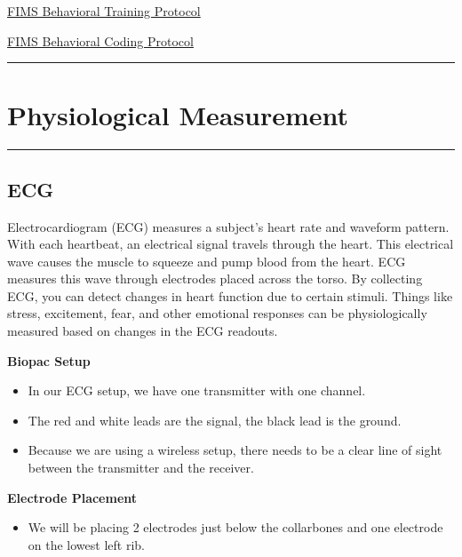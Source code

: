 \documentclass[
]{book}
\providecommand{\tightlist}{%
  \setlength{\itemsep}{0pt}\setlength{\parskip}{0pt}}
\begin{document}
\href{https://docs.google.com/document/d/1oLEg1gAdpcrDWg1Vlh0z_esq9fBy9CKBrNuU-ZokaKg/edit?usp=sharing}{FIMS Behavioral Training Protocol}

\href{https://docs.google.com/document/d/1zd4BD7-yQZxle4bH_cXrEaqFAd3MCVKATnVE1PnWn_4/edit?usp=sharing}{FIMS Behavioral Coding Protocol}

\begin{center}\rule{0.5\linewidth}{0.5pt}\end{center}

\hypertarget{physiological-measurement}{%
\section{Physiological Measurement}\label{physiological-measurement}}

\begin{center}\rule{0.5\linewidth}{0.5pt}\end{center}

\hypertarget{ecg}{%
\subsection{ECG}\label{ecg}}

Electrocardiogram (ECG) measures a subject's heart rate and waveform pattern. With each heartbeat, an electrical signal travels through the heart. This electrical wave causes the muscle to squeeze and pump blood from the heart. ECG measures this wave through electrodes placed across the torso. By collecting ECG, you can detect changes in heart function due to certain stimuli. Things like stress, excitement, fear, and other emotional responses can be physiologically measured based on changes in the ECG readouts.

\textbf{Biopac Setup}

\begin{itemize}
\tightlist
\item
  In our ECG setup, we have one transmitter with one channel.
\item
  The red and white leads are the signal, the black lead is the ground.
\item
  Because we are using a wireless setup, there needs to be a clear line of sight between the transmitter and the receiver.
\end{itemize}

\textbf{Electrode Placement}

\begin{itemize}
\tightlist
\item
  We will be placing 2 electrodes just below the collarbones and one electrode on the lowest left rib.
\end{itemize}
\end{document}
